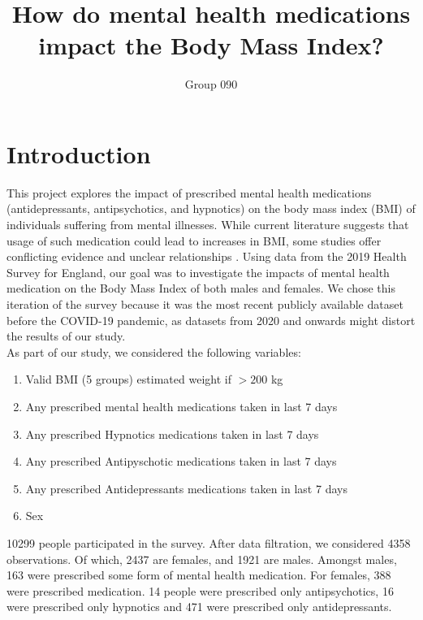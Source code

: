\documentclass[12pt]{article}
\title{How do mental health medications impact the Body Mass Index?}
\author{Group 090}
\date{}
\begin{document}
\maketitle

\section{Introduction}

 This project explores the impact of prescribed mental health medications (antidepressants, antipsychotics, and hypnotics) on the body mass index (BMI) of individuals suffering from mental illnesses. While current literature suggests that usage of such medication could lead to increases in BMI, some studies offer conflicting evidence and unclear relationships \citep{ ALBERICH2019112506}. Using data from the 2019 Health Survey for England, our goal was to investigate the impacts of mental health medication on the Body Mass Index of both males and females. We chose this iteration of the survey because it was the most recent publicly available dataset before the COVID-19 pandemic, as datasets from 2020 and onwards might distort the results of our study. \\
 

\noindent 
As part of our study, we considered the following variables: 

\begin{enumerate}
    
    \item Valid BMI (5 groups) estimated weight if $>200$ kg

   \item Any prescribed mental health 
medications taken in last 7 days

    \item Any prescribed Hypnotics medications taken in last 7 days

    \item Any prescribed Antipyschotic medications taken in last 7 days

    \item Any prescribed Antidepressants medications taken in last 7 days

    \item Sex
\end{enumerate}

10299 people participated in the survey. After data filtration, we considered 4358 observations. Of which, 2437 are females, and 1921 are males. Amongst males, 163 were prescribed some form of mental health medication. For females, 388 were prescribed medication. 14 people were prescribed only antipsychotics, 16 were prescribed only hypnotics and 471 were prescribed only antidepressants.
\end{document}
